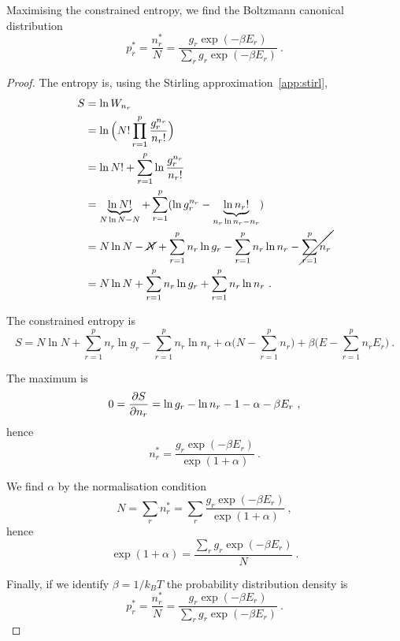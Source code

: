     Maximising the constrained entropy, we find the Boltzmann canonical distribution 
    \begin{equation*}
        p_r^* = \frac{n_r^*}{N} = \frac{g_r \exp(- \beta E_r)}{\sum_r g_r \exp(- \beta E_r)} ~.
    \end{equation*}
    \begin{proof}
        The entropy is, using the Stirling approximation~\eqref{app:stirl},
        \begin{equation*}
        \begin{aligned}
            S & = \ln W_{n_r} \\ & = \ln \Big (N! \prod_{r=1}^p \frac{g_r^{n_r}}{n_r!} \Big) \\ & = \ln N! + \sum_{r=1}^p \ln \frac{g_r^{n_r}}{n_r!} \\ & = \underbrace{\ln N!}_{N \ln N - N} + \sum_{r=1}^p (\ln g_r^{n_r} - \underbrace{\ln n_r!}_{n_r \ln n_r - n_r} ) \\ & = N \ln N - \cancel{N} + \sum_{r=1}^p n_r \ln g_r - \sum_{r=1}^p n_r \ln n_r - \cancel{\sum_{r=1}^p n_r} \\ & = N \ln N + \sum_{r=1}^p n_r \ln g_r + \sum_{r=1}^p n_r \ln n_r ~.
        \end{aligned}
        \end{equation*}

        The constrained entropy is
        \begin{equation*}
            S =  N \ln N + \sum_{r=1}^p n_r \ln g_r - \sum_{r=1}^p n_r \ln n_r + \alpha \Big (N - \sum_{r=1}^p n_r \Big) + \beta \Big (E - \sum_{r=1}^p n_r E_r \Big ) ~.
        \end{equation*}

        The maximum is 
        \begin{equation*}
            0 = \frac{\partial S}{\partial n_r} = \ln g_r - \ln n_r - 1 - \alpha - \beta E_r ~,
        \end{equation*}
        hence 
        \begin{equation*}
            n_r^* = \frac{g_r \exp(- \beta E_r)}{\exp(1 + \alpha)} ~.
        \end{equation*}

        We find $\alpha$ by the normalisation condition 
        \begin{equation*}
            N = \sum_r n_r^* = \sum_r \frac{g_r \exp(- \beta E_r)}{\exp(1 + \alpha)} ~,
        \end{equation*}
        hence 
        \begin{equation*}
            \exp(1 + \alpha) = \frac{\sum_r g_r \exp(- \beta E_r)}{N} ~.
        \end{equation*}

        Finally, if we identify $\beta = 1/k_B T$ the probability distribution density is
        \begin{equation*}
            p_r^* = \frac{n_r^*}{N} = \frac{g_r \exp(- \beta E_r)}{\sum_r g_r \exp(- \beta E_r)} ~.
        \end{equation*}
    \end{proof}
